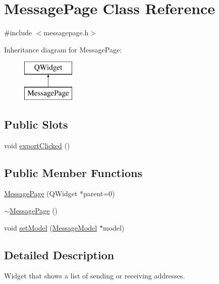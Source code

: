 \hypertarget{class_message_page}{}\section{Message\+Page Class Reference}
\label{class_message_page}


{\ttfamily \#include $<$messagepage.\+h$>$}

Inheritance diagram for Message\+Page\+:\begin{figure}[H]
\begin{center}
\leavevmode
\includegraphics[height=2.000000cm]{class_message_page}
\end{center}
\end{figure}
\subsection*{Public Slots}
\begin{DoxyCompactItemize}
\item 
void \hyperlink{class_message_page_a07a42c8f15c071a62de6a6fa2e96f267}{export\+Clicked} ()
\end{DoxyCompactItemize}
\subsection*{Public Member Functions}
\begin{DoxyCompactItemize}
\item 
\hyperlink{class_message_page_ad0a8662b7ae1bdd2274a277813bf7b35}{Message\+Page} (Q\+Widget $\ast$parent=0)
\item 
\hyperlink{class_message_page_a63817b01b66bffebf44a20ee3fdb5197}{$\sim$\+Message\+Page} ()
\item 
void \hyperlink{class_message_page_ae4ba8b28922b983da1a5419365feef05}{set\+Model} (\hyperlink{class_message_model}{Message\+Model} $\ast$model)
\end{DoxyCompactItemize}


\subsection{Detailed Description}
Widget that shows a list of sending or receiving addresses. 

